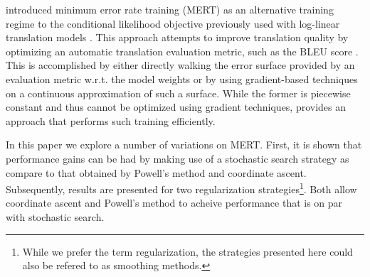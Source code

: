 \documentclass[11pt,tightenlines,kern-1pt]{article}
\begin{document}



 introduced minimum error rate training (MERT) as an alternative training regime to the conditional likelihood objective previously used with log-linear translation models \cite{och2002}. This approach attempts to improve translation quality by optimizing an automatic translation evaluation metric, such as the BLEU score \cite{kishore2002}. This is accomplished by either directly walking the error surface provided by an evaluation metric w.r.t\@. the model weights or by using gradient-based techniques on a continuous approximation of such a surface. While the former is piecewise constant and thus cannot be optimized using gradient techniques,  provides an approach that performs such training efficiently.

In this paper we explore a number of variations on MERT. First, it is shown that performance gains can be had by making use of a stochastic search strategy as compare to that obtained by Powell's method and coordinate ascent. Subsequently, results are presented for two regularization strategies\footnote{While we prefer the term regularization, the strategies presented here could also be refered to as smoothing methods.}. Both allow coordinate ascent and Powell's method to acheive performance that is on par with stochastic search. 
\end{document}
